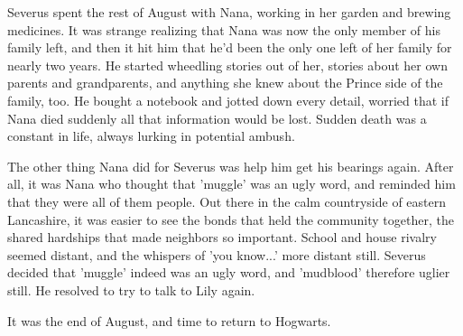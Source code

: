 \documentclass[a4paper,11pt]{article}
\begin{document}
Severus spent the rest of August with Nana, working in her garden and brewing medicines. It was strange realizing that Nana was now the only member of his family left, and then it hit him that he'd been the only one left of her family for nearly two years. He started wheedling stories out of her, stories about her own parents and grandparents, and anything she knew about the Prince side of the family, too. He bought a notebook and jotted down every detail, worried that if Nana died suddenly all that information would be lost. Sudden death was a constant in life, always lurking in potential ambush.

The other thing Nana did for Severus was help him get his bearings again. After all, it was Nana who thought that 'muggle' was an ugly word, and reminded him that they were all of them people. Out there in the calm countryside of eastern Lancashire, it was easier to see the bonds that held the community together, the shared hardships that made neighbors so important. School and house rivalry seemed distant, and the whispers of 'you know...' more distant still. Severus decided that 'muggle' indeed was an ugly word, and 'mudblood' therefore uglier still. He resolved to try to talk to Lily again.

It was the end of August, and time to return to Hogwarts.
\end{document}
